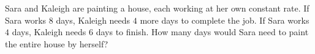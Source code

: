 Sara and Kaleigh are painting a house, each working at her own constant rate. If Sara works $8$ days, Kaleigh needs $4$ more days to complete the job. If Sara works $4$ days, Kaleigh needs $6$ days to finish. How many days would Sara need to paint the entire house by herself?
